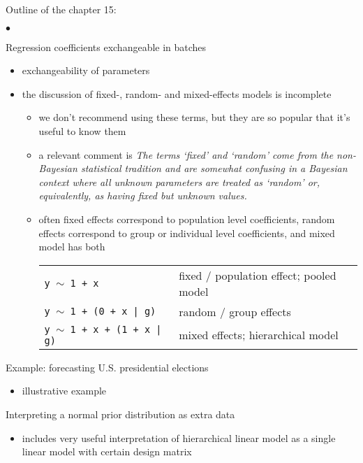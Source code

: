 \documentclass[a4paper,11pt]{article}
\begin{document}
\vspace{\baselineskip}
\noindent
Outline of the chapter 15:
\begin{list}{$\bullet$}{\parsep=0pt\itemsep=2pt}
\item[15.1] Regression coefficients exchangeable in batches
    \begin{itemize}
    \item exchangeability of parameters
    \item the discussion of fixed-, random- and mixed-effects models
      is incomplete
      \begin{itemize}
      \item we don't recommend using these terms, but they are so
        popular that it's useful to know them
      \item a relevant comment is \emph{The terms ‘fixed’ and ‘random’
          come from the non-Bayesian statistical tradition and are
          somewhat confusing in a Bayesian context where all unknown
          parameters are treated as ‘random’ or, equivalently, as
          having fixed but unknown values.}
      \item often fixed effects correspond to population level
        coefficients, random effects correspond to group or individual
        level coefficients, and mixed model has both\\
        \begin{tabular}[t]{ll}
     {\tt y $\sim$ 1 + x} & fixed / population effect; pooled model\\
     {\tt y $\sim$ 1 + (0 + x | g) } & random / group effects \\
     {\tt y $\sim$ 1 + x + (1 + x | g) } & mixed effects; hierarchical model 
        \end{tabular}
      \end{itemize}
    \end{itemize}
  \item[15.2] Example: forecasting U.S. presidential elections
    \begin{itemize}
    \item illustrative example
    \end{itemize}
  \item[15.3] Interpreting a normal prior distribution as extra data
    \begin{itemize}
    \item includes very useful interpretation of hierarchical linear
      model as a single linear model with certain design matrix
    \end{itemize}

\end{list}
\end{document}
